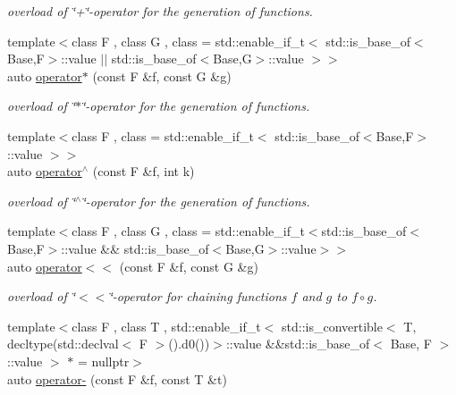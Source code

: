 \begin{DoxyCompactItemize}
\begin{DoxyCompactList}\small\item\em overload of \char`\"{}+\char`\"{}-\/operator for the generation of functions. \end{DoxyCompactList}\item 
{\footnotesize template$<$class F , class G , class  = std\+::enable\+\_\+if\+\_\+t$<$ std\+::is\+\_\+base\+\_\+of$<$\+Base,\+F$>$\+::value $\vert$$\vert$ std\+::is\+\_\+base\+\_\+of$<$\+Base,\+G$>$\+::value $>$$>$ }\\auto \hyperlink{namespaceFunG_a014be932d3b4eb377d8e60271e864438}{operator$\ast$} (const F \&f, const G \&g)
\begin{DoxyCompactList}\small\item\em overload of \char`\"{}$\ast$\char`\"{}-\/operator for the generation of functions. \end{DoxyCompactList}\item 
{\footnotesize template$<$class F , class  = std\+::enable\+\_\+if\+\_\+t$<$ std\+::is\+\_\+base\+\_\+of$<$\+Base,\+F$>$\+::value $>$$>$ }\\auto \hyperlink{namespaceFunG_aeb22ff63cd78cb63d81b601c656da2c1}{operator$^\wedge$} (const F \&f, int k)
\begin{DoxyCompactList}\small\item\em overload of \char`\"{}$^\wedge$\char`\"{}-\/operator for the generation of functions. \end{DoxyCompactList}\item 
{\footnotesize template$<$class F , class G , class  = std\+::enable\+\_\+if\+\_\+t$<$std\+::is\+\_\+base\+\_\+of$<$\+Base,\+F$>$\+::value \&\&                                     std\+::is\+\_\+base\+\_\+of$<$\+Base,\+G$>$\+::value$>$$>$ }\\auto \hyperlink{namespaceFunG_a56701b5e83b96d2d6cc5c482e36caa39}{operator$<$$<$} (const F \&f, const G \&g)
\begin{DoxyCompactList}\small\item\em overload of \char`\"{}$<$$<$\char`\"{}-\/operator for chaining functions $f$ and $g$ to $ f \circ g $. \end{DoxyCompactList}\item 
{\footnotesize template$<$class F , class T , std\+::enable\+\_\+if\+\_\+t$<$ std\+::is\+\_\+convertible$<$ T, decltype(std\+::declval$<$ F $>$().\+d0())$>$\+::value \&\&std\+::is\+\_\+base\+\_\+of$<$ Base, F $>$\+::value $>$ $\ast$  = nullptr$>$ }\\auto \hyperlink{namespaceFunG_aa0c4552dee9179fb50b57ece863d835a}{operator-\/} (const F \&f, const T \&t)

\end{DoxyCompactItemize}
